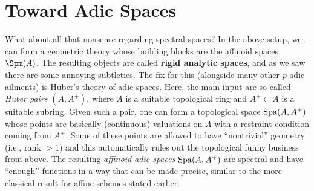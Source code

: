 \documentclass[11pt]{article}
\begin{document}
\section{Toward Adic Spaces}
What about all that nonsense regarding spectral spaces? In the above setup, we can form a geometric theory whose building blocks are the affinoid spaces $\Spm(A)$. The resulting objects are called \textbf{rigid analytic spaces}, and as we saw there are some annoying subtleties. The fix for this (alongside many other $p$-adic ailments) is Huber's theory of adic spaces. Here, the main input are so-called \emph{Huber pairs} $(A,A^+)$, where $A$ is a suitable topological ring and $A^+\subset A$ is a suitable subring. Given such a pair, one can form a topological space $\operatorname{Spa}(A,A^+)$ whose points are basically (continuous) valuations on $A$ with a restraint condition coming from $A^+$. Some of these points are allowed to have ``nontrivial'' geometry (i.e., rank $>1$) and this automatically rules out the topological funny business from above. The resulting \emph{affinoid adic spaces} $\operatorname{Spa}(A,A^+)$ are spectral and have ``enough'' functions in a way that can be made precise, similar to the more classical result for affine schemes stated earlier.
\end{document}
